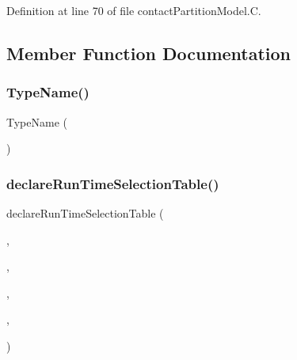 Definition at line 70 of file contact\+Partition\+Model.\+C.



\subsection{Member Function Documentation}
\mbox{\label{classFoam_1_1contactPartitionModel_a5a059c2cce1afb39fb3699021ced8d2e}} 
\subsubsection{\texorpdfstring{Type\+Name()}{TypeName()}}
{\footnotesize\ttfamily Type\+Name (\begin{DoxyParamCaption}\item[{\char`\"{}contact\+Partition\+Model\char`\"{}}]{ }\end{DoxyParamCaption})}

\mbox{\label{classFoam_1_1contactPartitionModel_af0603c475d8d6b29865ee7a3b228fab9}} 
\subsubsection{\texorpdfstring{declare\+Run\+Time\+Selection\+Table()}{declareRunTimeSelectionTable()}}
{\footnotesize\ttfamily declare\+Run\+Time\+Selection\+Table (\begin{DoxyParamCaption}\item[{auto\+Ptr}]{,  }\item[{\hyperlink{classFoam_1_1contactPartitionModel}{contact\+Partition\+Model}}]{,  }\item[{contact\+Partition\+Models}]{,  }\item[{(const \hyperlink{classFoam_1_1FSPair}{F\+S\+Pair} \&pair, const dictionary \&dict, const object\+Registry \&obj\+Reg)}]{,  }\item[{(pair, dict, obj\+Reg)}]{ }\end{DoxyParamCaption})}


